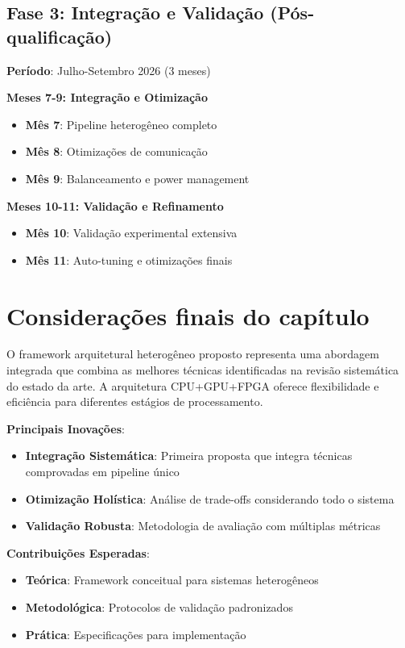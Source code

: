 \subsection{Fase 3: Integração e Validação (Pós-qualificação)}\label{subsec:fase3_integracao}

\textbf{Período}: Julho-Setembro 2026 (3 meses)

\textbf{Meses 7-9: Integração e Otimização}
\begin{itemize}
    \item \textbf{Mês 7}: Pipeline heterogêneo completo
    \item \textbf{Mês 8}: Otimizações de comunicação
    \item \textbf{Mês 9}: Balanceamento e power management
\end{itemize}

\textbf{Meses 10-11: Validação e Refinamento}
\begin{itemize}
    \item \textbf{Mês 10}: Validação experimental extensiva
    \item \textbf{Mês 11}: Auto-tuning e otimizações finais
\end{itemize}

\section{Considerações finais do capítulo}\label{sec:consideracoes_finais_cap3}

O framework arquitetural heterogêneo proposto representa uma abordagem integrada que combina as melhores técnicas identificadas na revisão sistemática do estado da arte. A arquitetura CPU+GPU+FPGA oferece flexibilidade e eficiência para diferentes estágios de processamento.

\textbf{Principais Inovações}:
\begin{itemize}
    \item \textbf{Integração Sistemática}: Primeira proposta que integra técnicas comprovadas em pipeline único
    \item \textbf{Otimização Holística}: Análise de trade-offs considerando todo o sistema
    \item \textbf{Validação Robusta}: Metodologia de avaliação com múltiplas métricas
\end{itemize}

\textbf{Contribuições Esperadas}:
\begin{itemize}
    \item \textbf{Teórica}: Framework conceitual para sistemas heterogêneos
    \item \textbf{Metodológica}: Protocolos de validação padronizados
    \item \textbf{Prática}: Especificações para implementação
\end{itemize}

